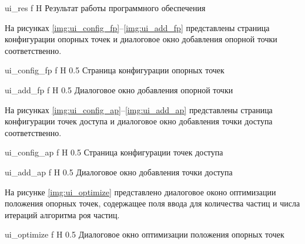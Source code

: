     {ui_res}
    {f}
    {H}
    {\linewidth}
    {Результат работы программного обеспечения}

\clearpage

На рисунках \ref{img:ui_config_fp}--\ref{img:ui_add_fp} представлены страница конфигурации опорных точек и диалоговое окно добавления опорной точки соответственно.

    {ui_config_fp}
    {f}
    {H}
    {0.5\linewidth}
    {Страница конфигурации опорных точек}

    {ui_add_fp}
    {f}
    {H}
    {0.5\linewidth}
    {Диалоговое окно добавления опорной точки}

\clearpage

На рисунках \ref{img:ui_config_ap}--\ref{img:ui_add_ap} представлены страница конфигурации точек доступа и диалоговое окно добавления точки доступа соответственно.

    {ui_config_ap}
    {f}
    {H}
    {0.5\linewidth}
    {Страница конфигурации точек доступа}

    {ui_add_ap}
    {f}
    {H}
    {0.5\linewidth}
    {Диалоговое окно добавления точки доступа}

\clearpage

На рисунке \ref{img:ui_optimize} представлено диалоговое оконо оптимизации положения опорных точек, содержащее поля ввода для количества частиц и числа итераций алгоритма роя частиц.

    {ui_optimize}
    {f}
    {H}
    {0.5\linewidth}
    {Диалоговое окно оптимизации положения опорных точек}


